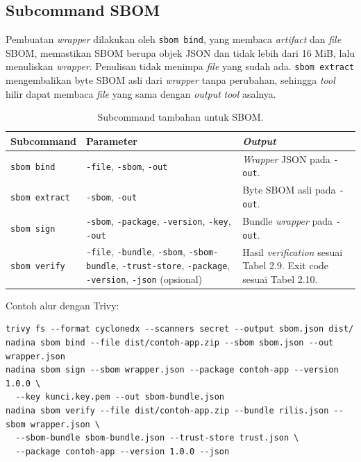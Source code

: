 \subsection{Subcommand SBOM}
Pembuatan \textit{wrapper} dilakukan oleh \texttt{sbom bind}, yang membaca \textit{artifact} dan \textit{file} SBOM, memastikan
SBOM berupa objek JSON dan tidak lebih dari 16 MiB, lalu menuliskan \textit{wrapper}. Penulisan tidak
menimpa \textit{file} yang sudah ada. \texttt{sbom extract} mengembalikan byte SBOM asli dari
\textit{wrapper} tanpa perubahan, sehingga \textit{tool} hilir dapat membaca \textit{file} yang sama dengan \textit{output}
\textit{tool} asalnya.

\begin{table}[H]
\centering
\begin{tabular}{@{}p{2.8cm}p{5.6cm}p{5cm}@{}}
\toprule
Subcommand & Parameter & \textit{Output} \\
\midrule
\texttt{sbom bind} & \texttt{-file}, \texttt{-sbom}, \texttt{-out} &
\textit{Wrapper} JSON pada \texttt{-out}. \\
\texttt{sbom extract} & \texttt{-sbom}, \texttt{-out} &
Byte SBOM asli pada \texttt{-out}. \\
\texttt{sbom sign} & \texttt{-sbom}, \texttt{-package}, \texttt{-version}, \texttt{-key}, \texttt{-out} &
Bundle \textit{wrapper} pada \texttt{-out}. \\
\texttt{sbom verify} & \texttt{-file}, \texttt{-bundle}, \texttt{-sbom}, \texttt{-sbom-bundle}, \texttt{-trust-store}, \texttt{-package}, \texttt{-version}, \texttt{-json} (opsional) &
Hasil \textit{verification} sesuai Tabel 2.9. Exit code sesuai Tabel 2.10. \\
\bottomrule
\end{tabular}
\caption{Subcommand tambahan untuk SBOM.}
\end{table}

Contoh alur dengan Trivy:

\begin{lstlisting}[basicstyle=\ttfamily\footnotesize,caption={Alur SBOM dengan kakas eksternal},label={lst:sbom-flow},numbers=none]
trivy fs --format cyclonedx --scanners secret --output sbom.json dist/
nadina sbom bind --file dist/contoh-app.zip --sbom sbom.json --out wrapper.json
nadina sbom sign --sbom wrapper.json --package contoh-app --version 1.0.0 \
  --key kunci.key.pem --out sbom-bundle.json
nadina sbom verify --file dist/contoh-app.zip --bundle rilis.json --sbom wrapper.json \
  --sbom-bundle sbom-bundle.json --trust-store trust.json \
  --package contoh-app --version 1.0.0 --json
\end{lstlisting}
